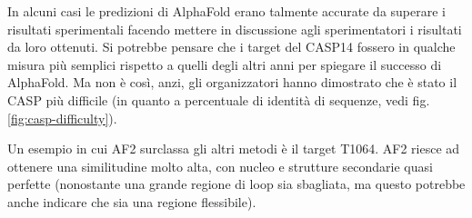 In alcuni casi le predizioni di AlphaFold erano talmente accurate da superare i risultati sperimentali facendo mettere in discussione agli sperimentatori i risultati da loro ottenuti. Si potrebbe pensare che i target del CASP14 fossero in qualche misura più semplici rispetto a quelli degli altri anni per spiegare il successo di AlphaFold. Ma non è così, anzi, gli organizzatori hanno dimostrato che è stato il CASP più difficile (in quanto a percentuale di identità di sequenze, vedi fig. \ref{fig:casp-difficulty}).

Un esempio in cui AF2 surclassa gli altri metodi è il target T1064. AF2 riesce ad ottenere una similitudine molto alta, con nucleo e strutture secondarie quasi perfette (nonostante una grande regione di loop sia sbagliata, ma questo potrebbe anche indicare che sia una regione flessibile).

